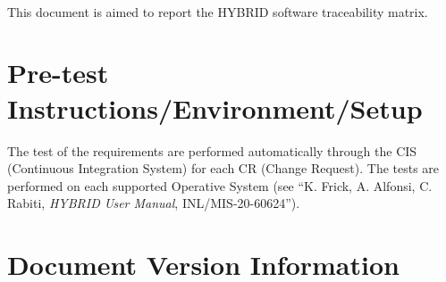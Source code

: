 \documentclass[pdf,12pt]{../../user_manual/INLreport}
\begin{document}




    \SANDmain		%


\\This document is aimed to report the HYBRID software traceability matrix.



\section{Pre-test Instructions/Environment/Setup}
The test of the requirements are performed automatically through
the CIS (Continuous Integration System) for each CR (Change Request).
The tests are performed on each supported Operative System (see ``K. Frick, A. Alfonsi, C. Rabiti, \textit{HYBRID User Manual}, INL/MIS-20-60624'').



 





\section*{Document Version Information}


\end{document}
